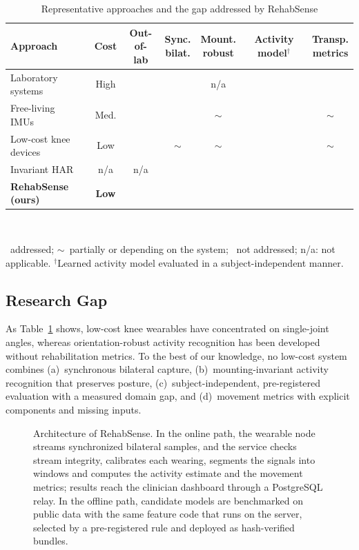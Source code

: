 \documentclass[conference]{IEEEtran}
\newcommand{\yes}{\ding{51}}
\newcommand{\no}{\ding{55}}
\newcommand{\pt}{$\sim$}
\begin{document}
\begin{table}[t]
\caption{Representative approaches and the gap addressed by RehabSense}
\label{tab:gap}
\centering
\scriptsize
\setlength{\tabcolsep}{2.4pt}
\begin{tabular}{@{}p{2.75cm}cccccc@{}}
\toprule
Approach & Cost & \shortstack{Out-of-\\lab} & \shortstack{Sync.\\bilat.} & \shortstack{Mount.\\robust} & \shortstack{Activity\\model$^\dagger$} & \shortstack{Transp.\\metrics} \\
\midrule
Laboratory systems~\cite{tan2023} & High & \no & \yes & n/a & \no & \yes \\
Free-living IMUs~\cite{phan2026} & Med. & \yes & \yes & \pt & \no & \pt \\
Low-cost knee devices \cite{korbel2026,joshita2026,achmamad2025} & Low & \yes & \pt & \pt & \no & \pt \\
Invariant HAR \cite{yurtman2017,gilmartin2023,baek2026} & n/a & n/a & \no & \yes & \yes & \no \\
\textbf{RehabSense (ours)} & \textbf{Low} & \yes & \yes & \yes & \yes & \yes \\
\bottomrule
\end{tabular}\\[2pt]
\parbox{\columnwidth}{\scriptsize \yes~addressed; \pt~partially or depending on the system; \no~not addressed; n/a: not applicable. $^\dagger$Learned activity model evaluated in a subject-independent manner.}
\end{table}

\subsection{Research Gap}
As Table~\ref{tab:gap} shows, low-cost knee wearables have concentrated on single-joint angles, whereas orientation-robust activity recognition has been developed without rehabilitation metrics. To the best of our knowledge, no low-cost system combines (a)~synchronous bilateral capture, (b)~mounting-invariant activity recognition that preserves posture, (c)~subject-independent, pre-registered evaluation with a measured domain gap, and (d)~movement metrics with explicit components and missing inputs.

\begin{figure}[t]
\centering

\caption{Architecture of RehabSense. In the online path, the wearable node streams synchronized bilateral samples, and the service checks stream integrity, calibrates each wearing, segments the signals into windows and computes the activity estimate and the movement metrics; results reach the clinician dashboard through a PostgreSQL relay. In the offline path, candidate models are benchmarked on public data with the same feature code that runs on the server, selected by a pre-registered rule and deployed as hash-verified bundles.}
\label{fig:arch}
\end{figure}
\end{document}
